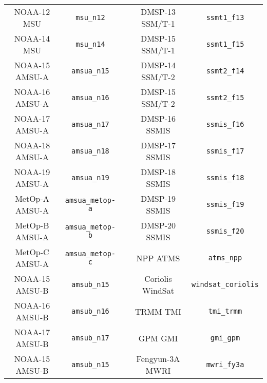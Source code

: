 \begin{table}[htp]
\begin{tabular}{c c c c c}
NOAA-12 MSU     & \texttt{msu\_n12}       & \hspace{0.2cm} & DMSP-13 SSM/T-1  & \texttt{ssmt1\_f13}         \\
NOAA-14 MSU     & \texttt{msu\_n14}       & \hspace{0.2cm} & DMSP-15 SSM/T-1  & \texttt{ssmt1\_f15}         \\
NOAA-15 AMSU-A  & \texttt{amsua\_n15}     & \hspace{0.2cm} & DMSP-14 SSM/T-2  & \texttt{ssmt2\_f14}         \\
NOAA-16 AMSU-A  & \texttt{amsua\_n16}     & \hspace{0.2cm} & DMSP-15 SSM/T-2  & \texttt{ssmt2\_f15}         \\
NOAA-17 AMSU-A  & \texttt{amsua\_n17}     & \hspace{0.2cm} & DMSP-16 SSMIS    & \texttt{ssmis\_f16}         \\
NOAA-18 AMSU-A  & \texttt{amsua\_n18}     & \hspace{0.2cm} & DMSP-17 SSMIS    & \texttt{ssmis\_f17}         \\
NOAA-19 AMSU-A  & \texttt{amsua\_n19}     & \hspace{0.2cm} & DMSP-18 SSMIS    & \texttt{ssmis\_f18}         \\
MetOp-A AMSU-A  & \texttt{amsua\_metop-a} & \hspace{0.2cm} & DMSP-19 SSMIS    & \texttt{ssmis\_f19}         \\
MetOp-B AMSU-A  & \texttt{amsua\_metop-b} & \hspace{0.2cm} & DMSP-20 SSMIS    & \texttt{ssmis\_f20}         \\
MetOp-C AMSU-A  & \texttt{amsua\_metop-c} & \hspace{0.2cm} & NPP ATMS         & \texttt{atms\_npp}          \\
NOAA-15 AMSU-B  & \texttt{amsub\_n15}     & \hspace{0.2cm} & Coriolis WindSat & \texttt{windsat\_coriolis}  \\
NOAA-16 AMSU-B  & \texttt{amsub\_n16}     & \hspace{0.2cm} & TRMM TMI         & \texttt{tmi\_trmm}          \\
NOAA-17 AMSU-B  & \texttt{amsub\_n17}     & \hspace{0.2cm} & GPM GMI          & \texttt{gmi\_gpm}           \\
NOAA-15 AMSU-B  & \texttt{amsub\_n15}     & \hspace{0.2cm} & Fengyun-3A MWRI  & \texttt{mwri\_fy3a}         \\

\end{tabular}
\end{table}
